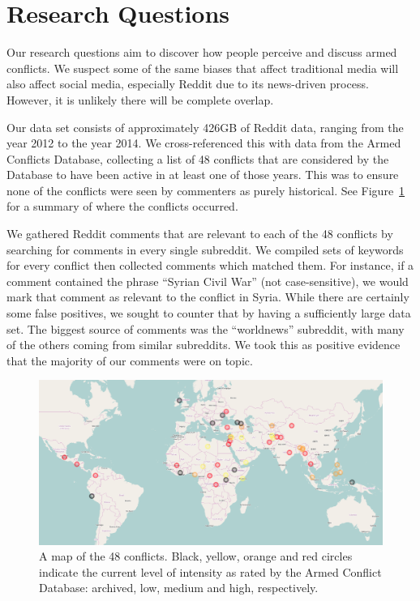\section{Research Questions}
Our research questions aim to discover how people perceive and discuss armed conflicts. We suspect some of the same biases that affect traditional media will also affect social media, especially Reddit due to its news-driven process. However, it is unlikely there will be complete overlap.

Our data set consists of approximately 426GB of Reddit data, ranging from the year 2012 to the year 2014. We cross-referenced this with data from the Armed Conflicts Database, collecting a list of 48 conflicts that are considered by the Database to have been active in at least one of those years. This was to ensure none of the conflicts were seen by commenters as purely historical. See Figure~\ref{conflicts} for a summary of where the conflicts occurred. 

We gathered Reddit comments that are relevant to each of the 48 conflicts by searching for comments in every single subreddit. We compiled sets of keywords for every conflict then collected comments which matched them. For instance, if a comment contained the phrase ``Syrian Civil War'' (not case-sensitive), we would mark that comment as relevant to the conflict in Syria. While there are certainly some false positives, we sought to counter that by having a sufficiently large data set. The biggest source of comments was the ``worldnews'' subreddit, with many of the others coming from similar subreddits. We took this as positive evidence that the majority of our comments were on topic. 

\begin{figure}
\centering
\includegraphics[width=0.9\columnwidth]{map}
\caption{A map of the 48 conflicts. Black, yellow, orange and red circles indicate the current level of intensity as rated by the Armed Conflict Database: archived, low, medium and high, respectively.}
\label{conflicts}
\end{figure}